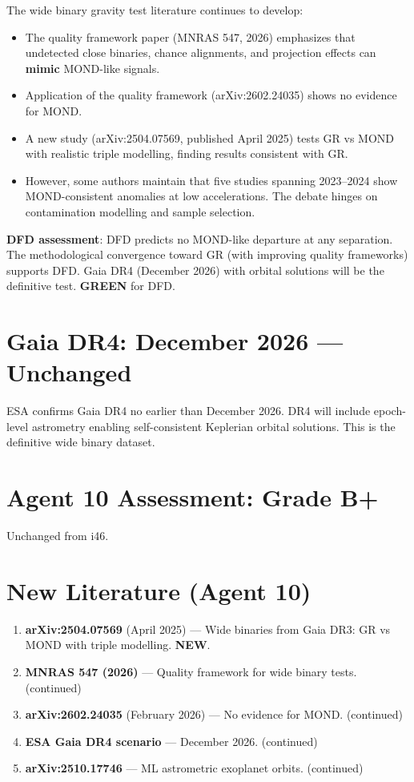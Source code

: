 \documentclass[11pt,a4paper]{article}
\newcommand{\GREEN}{\textcolor{dfdgreen}{\textbf{GREEN}}}
\newcommand{\NEW}{\textcolor{dfdblue}{\textbf{NEW}}}
\begin{document}
\begin{tcolorbox}[colback=blue!5!white, colframe=blue!60!black,
  title={Wide Binary Gravity Tests: Methodological Convergence Toward GR}]

The wide binary gravity test literature continues to develop:
\begin{itemize}
\item The quality framework paper (MNRAS 547, 2026) emphasizes that undetected close binaries, chance alignments, and projection effects can \textbf{mimic} MOND-like signals.
\item Application of the quality framework (arXiv:2602.24035) shows no evidence for MOND.
\item A new study (arXiv:2504.07569, published April 2025) tests GR vs MOND with realistic triple modelling, finding results consistent with GR.
\item However, some authors maintain that five studies spanning 2023--2024 show MOND-consistent anomalies at low accelerations. The debate hinges on contamination modelling and sample selection.
\end{itemize}

\textbf{DFD assessment}: DFD predicts no MOND-like departure at any separation. The methodological convergence toward GR (with improving quality frameworks) supports DFD. Gaia DR4 (December 2026) with orbital solutions will be the definitive test. \GREEN{} for DFD.
\end{tcolorbox}

\section{Gaia DR4: December 2026 --- Unchanged}

ESA confirms Gaia DR4 no earlier than December 2026. DR4 will include epoch-level astrometry enabling self-consistent Keplerian orbital solutions. This is the definitive wide binary dataset.

\section{Agent 10 Assessment: Grade B+}

Unchanged from i46.

\section{New Literature (Agent 10)}

\begin{enumerate}
\item \textbf{arXiv:2504.07569} (April 2025) --- Wide binaries from Gaia DR3: GR vs MOND with triple modelling. \NEW.
\item \textbf{MNRAS 547 (2026)} --- Quality framework for wide binary tests. (continued)
\item \textbf{arXiv:2602.24035} (February 2026) --- No evidence for MOND. (continued)
\item \textbf{ESA Gaia DR4 scenario} --- December 2026. (continued)
\item \textbf{arXiv:2510.17746} --- ML astrometric exoplanet orbits. (continued)
\end{enumerate}
\end{document}
